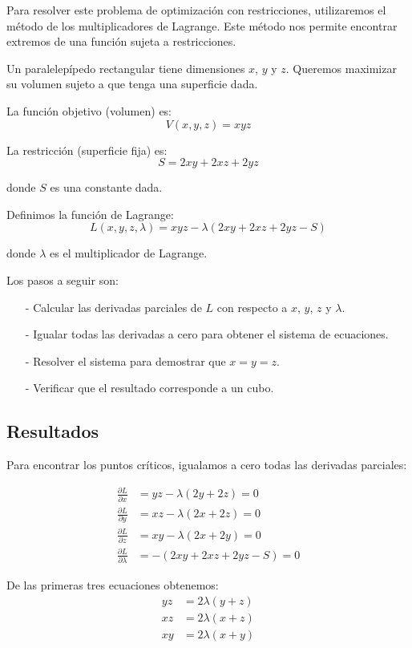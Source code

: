\documentclass{article}
\begin{document}
Para resolver este problema de optimización con restricciones, utilizaremos el método de los multiplicadores de Lagrange. Este método nos permite encontrar extremos de una función sujeta a restricciones. 

Un paralelepípedo rectangular tiene dimensiones $x$, $y$ y $z$. Queremos maximizar su volumen sujeto a que tenga una superficie dada.

La función objetivo (volumen) es:
$$V(x,y,z) = xyz$$

La restricción (superficie fija) es:
$$S = 2xy + 2xz + 2yz$$

donde $S$ es una constante dada.

Definimos la función de Lagrange:
$$L(x,y,z,\lambda) = xyz - \lambda(2xy + 2xz + 2yz - S)$$

donde $\lambda$ es el multiplicador de Lagrange.

Los pasos a seguir son:
\begin{enumerate}
    \item[-] Calcular las derivadas parciales de $L$ con respecto a $x$, $y$, $z$ y $\lambda$.
    \item[-] Igualar todas las derivadas a cero para obtener el sistema de ecuaciones.
    \item[-] Resolver el sistema para demostrar que $x = y = z$.
    \item[-] Verificar que el resultado corresponde a un cubo.
\end{enumerate}

\subsection{Resultados}
\setcounter{equation}{0}

Para encontrar los puntos críticos, igualamos a cero todas las derivadas parciales:

\begin{align}
\frac{\partial L}{\partial x} &= yz - \lambda(2y + 2z) = 0 \\
\frac{\partial L}{\partial y} &= xz - \lambda(2x + 2z) = 0 \\
\frac{\partial L}{\partial z} &= xy - \lambda(2x + 2y) = 0 \\
\frac{\partial L}{\partial \lambda} &= -(2xy + 2xz + 2yz - S) = 0
\end{align}

De las primeras tres ecuaciones obtenemos:
\begin{align}
yz &= 2\lambda(y + z) \\
xz &= 2\lambda(x + z) \\
xy &= 2\lambda(x + y)
\end{align}
\end{document}

